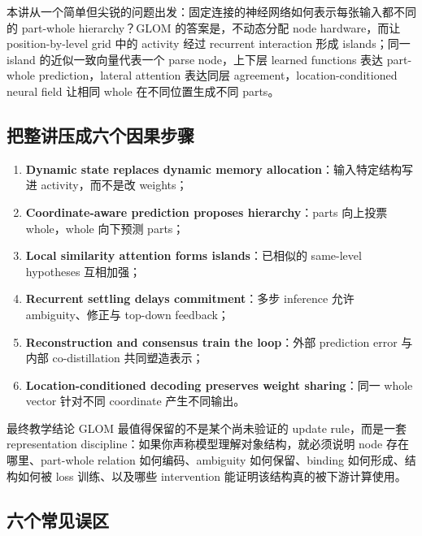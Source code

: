 \documentclass[a4paper]{article}
\begin{document}
本讲从一个简单但尖锐的问题出发：固定连接的神经网络如何表示每张输入都不同的 part-whole hierarchy？GLOM 的答案是，不动态分配 node hardware，而让 position-by-level grid 中的 activity 经过 recurrent interaction 形成 islands；同一 island 的近似一致向量代表一个 parse node，上下层 learned functions 表达 part-whole prediction，lateral attention 表达同层 agreement，location-conditioned neural field 让相同 whole 在不同位置生成不同 parts。

\subsection{把整讲压成六个因果步骤}

\begin{enumerate}
  \item \textbf{Dynamic state replaces dynamic memory allocation}：输入特定结构写进 activity，而不是改 weights；
  \item \textbf{Coordinate-aware prediction proposes hierarchy}：parts 向上投票 whole，whole 向下预测 parts；
  \item \textbf{Local similarity attention forms islands}：已相似的 same-level hypotheses 互相加强；
  \item \textbf{Recurrent settling delays commitment}：多步 inference 允许 ambiguity、修正与 top-down feedback；
  \item \textbf{Reconstruction and consensus train the loop}：外部 prediction error 与内部 co-distillation 共同塑造表示；
  \item \textbf{Location-conditioned decoding preserves weight sharing}：同一 whole vector 针对不同 coordinate 产生不同输出。
\end{enumerate}

\begin{importantbox}{最终教学结论}
GLOM 最值得保留的不是某个尚未验证的 update rule，而是一套 representation discipline：如果你声称模型理解对象结构，就必须说明 node 存在哪里、part-whole relation 如何编码、ambiguity 如何保留、binding 如何形成、结构如何被 loss 训练、以及哪些 intervention 能证明该结构真的被下游计算使用。
\end{importantbox}

\subsection{六个常见误区}
\end{document}
